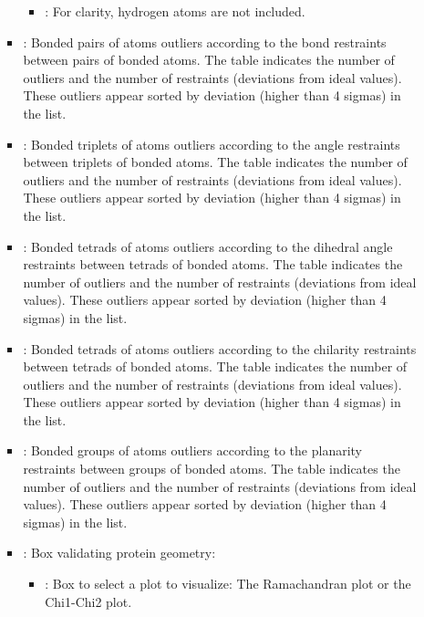 \begin{itemize}
\begin{itemize}
\begin{itemize}
\begin{itemize}
           \item {}: For clarity, hydrogen atoms are not included.
          \end{itemize}
          
         \item {}: Bonded pairs of atoms outliers   according to the bond restraints between pairs of bonded atoms. The  table indicates the number of outliers and the number of restraints (deviations from ideal values). These outliers appear sorted by deviation (higher than 4 sigmas) in the  list.
         \item {}: Bonded triplets of atoms outliers according to the angle restraints between triplets of bonded atoms. The  table indicates the number of outliers and the number of restraints (deviations from ideal values). These outliers appear sorted by deviation (higher than 4 sigmas) in the  list.
         \item {}: Bonded tetrads of atoms outliers  according to the dihedral angle restraints between tetrads of bonded atoms. The  table indicates the number of outliers and the number of restraints (deviations from ideal values). These outliers appear sorted by deviation (higher than 4 sigmas) in the  list.
         \item {}: Bonded tetrads of atoms outliers according to the chilarity restraints between tetrads of bonded atoms. The  table indicates the number of outliers and the number of restraints (deviations from ideal values). These outliers appear sorted by deviation (higher than 4 sigmas) in the  list.
         \item {}: Bonded groups of atoms outliers according to the planarity restraints between groups of bonded atoms. The  table indicates the number of outliers and the number of restraints (deviations from ideal values). These outliers appear sorted by deviation (higher than 4 sigmas) in the  list.
         \item {}: Box validating protein geometry:
         \begin{itemize}
          \item {}: Box to select a plot to visualize: The Ramachandran plot or the Chi1-Chi2 plot.

\end{itemize}
\end{itemize}
\end{itemize}
\end{itemize}
